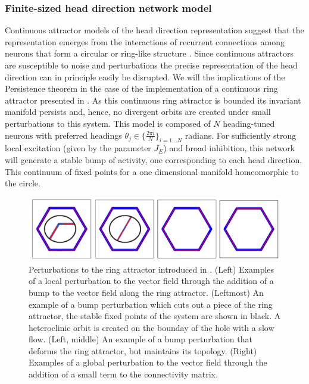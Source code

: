 \documentclass{article}
\newcounter{ct}
\theoremstyle{definition}
\theoremstyle{remark}
\begin{document}



\subsubsection{Finite-sized head direction network model}\label{sec:hd}
Continuous attractor models of the head direction representation suggest that the representation emerges from the interactions of recurrent connections among neurons that form a circular or ring-like structure \citep{zhang1996, Noorman2022, ajabi2023}. 
Since continuous attractors are susceptible to noise and perturbations the precise representation of the head direction can in principle easily be disrupted.
We will the implications of the Persistence theorem in the case of the implementation of a continuous ring attractor presented in \citep{Noorman2022}.
As this continuous ring attractor is bounded its invariant manifold persists and, hence, no divergent orbits are created under small perturbations to this system.
This model is composed of $N$ heading-tuned neurons  with preferred headings $\theta_j \in \{\frac{2\pi i}{N}\}_{i=1\dots N}$ radians.
For sufficiently strong local excitation (given by the parameter $J_E$) and broad inhibition, this network will generate a stable bump of activity, one corresponding to each head direction. This continuum of fixed points for a one dimensional manifold homeomorphic to the circle. 

\begin{figure}[H]
     \centering
  \includegraphics[width=\textwidth]{figures/Noorman_perturbations}
       \caption{Perturbations to the ring attractor introduced in \citep{Noorman2022}. (Left)  Examples of a local perturbation to the vector field through the addition of a bump to the vector field along the ring attractor.
       (Leftmost) An example of a bump perturbation which cuts out a piece of the ring attractor, the stable fixed points of the system are shown in black. A heteroclinic orbit is created on the bounday of the hole with a slow flow.
       (Left, middle) An example of a bump perturbation that deforms the ring attractor, but maintains its topology.
       (Right) Examples of a global perturbation to the vector field through the addition of a small term to the connectivity matrix. }
         \label{fig:Noorman_ring_activity_pert}
\end{figure}
\end{document}
